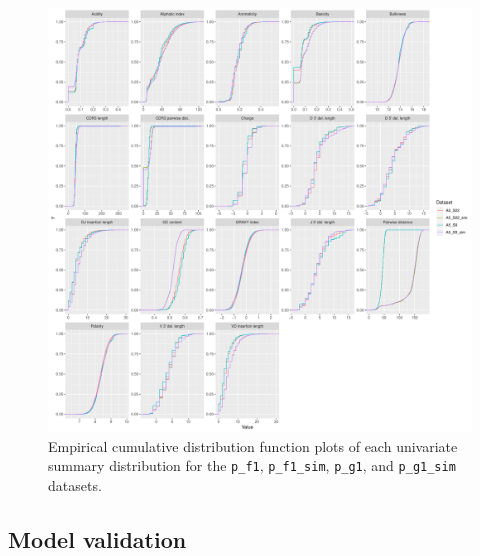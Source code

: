 \documentclass{article}
\begin{document}
\begin{figure}
    \includegraphics[width=\linewidth]{Figures/igor_ecdf.pdf}
    \caption{Empirical cumulative distribution function plots of each univariate summary distribution for the \texttt{p\_f1}, \texttt{p\_f1\_sim}, \texttt{p\_g1}, and \texttt{p\_g1\_sim} datasets.}
    \label{fig:MasterPlotECDF}
\end{figure}

\subsection*{Model validation}
\end{document}

